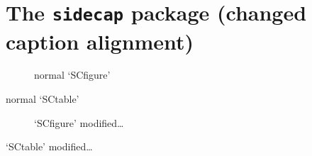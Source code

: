 \documentclass{article}
\begin{document}
\section*{\centering The \texttt{sidecap} package 
  (changed caption alignment)}

\begin{SCfigure}[][hb]
  \caption{normal `SCfigure'}
\end{SCfigure}

\begin{SCtable}[][b]
  \TABi
  \caption{normal `SCtable'}
\end{SCtable}

\iffalse%
\makeatletter
  \renewenvironment{SCfigure}{\SC@float[t]{figure}}
                             {\endSC@float}
  \renewenvironment{SCfigure*}{\SC@dblfloat[t]{figure}}
                              {\endSC@dblfloat}
  \renewenvironment{SCtable}{\SC@float[b]{table}}
                             {\endSC@float}
  \renewenvironment{SCtable*}{\SC@dblfloat[b]{table}}
                              {\endSC@dblfloat}
\makeatother
\fi


\begin{SCfigure}[][hb]
  \caption{`SCfigure' modified\dots}
\end{SCfigure}

\begin{SCtable}[][b]
  \TABi
  \caption{`SCtable' modified\dots}
\end{SCtable}
\end{document}

